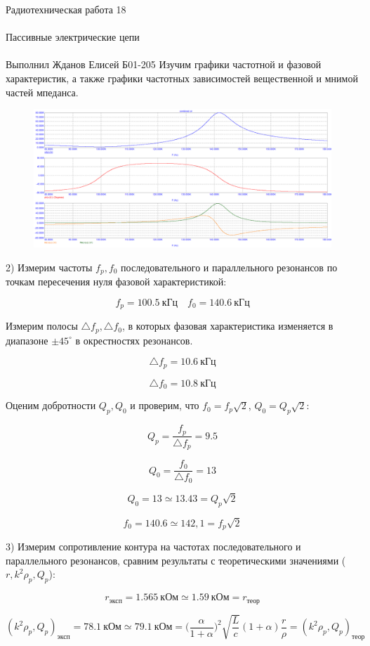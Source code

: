 \documentclass{astroedu-lab}
\begin{document}
\begin{problem}{\huge Радиотехническая работа 18\\\\Пассивные электрические цепи\\\\Выполнил Жданов Елисей Б01-205}
Изучим графики частотной и фазовой характеристик, а также графики частотных зависимостей вещественной и мнимой частей мпеданса.

\begin{figure}[h!]
\centering
\includegraphics[scale=0.4]{combined_AC1.png}
\label{fig:Image1}
\end{figure}

2) Измерим частоты $f_p, f_0$ последовательного и параллельного резонансов по точкам пересечения нуля фазовой характеристикой:

\[f_p = 100.5 \: \text{кГц} \quad f_0 = 140.6 \: \text{кГц}\]

Измерим полосы $\triangle f_p, \triangle f_0$, в которых фазовая характеристика изменяется в диапазоне $\pm 45 ^\circ$ в окрестностях резонансов.

\[\triangle f_p = 10.6 \: \text{кГц}\]

\[\triangle f_0 = 10.8 \: \text{кГц}\]

Оценим добротности $Q_p, Q_0$ и проверим, что $f_0 = f_p \sqrt{2}$, $Q_0 = Q_p \sqrt{2}$:

\[Q_p = \frac{f_p}{\triangle f_p} = 9.5\]

\[Q_0 = \frac{f_0}{\triangle f_0} = 13\]

\[Q_0 = 13 \simeq 13.43 = Q_p \sqrt{2}\]

\[f_0 = 140.6 \simeq 142,1 = f_p \sqrt{2}\]

3) Измерим сопротивление контура на частотах последовательного и параллельного резонансов, сравним результаты с теоретическими значениями ($r, k^2\rho_p, Q_p$):

\[r_{\text{эксп}} = 1.565 \: \text{кОм} \simeq 1.59 \: \text{кОм} = r_{\text{теор}}\]

\[(k^2\rho_p, Q_p)_{\text{эксп}} = 78.1 \: \text{кОм} \simeq  79.1 \: \text{кОм} = \Big(\frac{\alpha}{1 + \alpha}\Big)^2 \sqrt{\frac{L}{c}}(1 + \alpha)\frac{r}{\rho} = (k^2\rho_p, Q_p)_{\text{теор}}\]


\end{problem}
\end{document}
